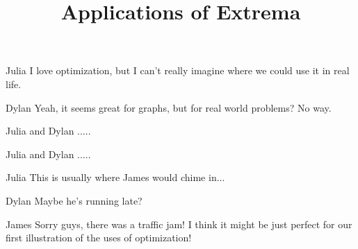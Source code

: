 \documentclass{ximera}
\title{Applications of Extrema}
\begin{document}
\maketitle
\begin{dialogue}
\item[Julia] I love optimization, but I can't really imagine where we could use it in real life.
\item[Dylan] Yeah, it seems great for graphs, but for real world problems? No way.
\item[Julia and Dylan] .....
\item[Julia and Dylan] .....
\item[Julia] This is usually where James would chime in...
\item[Dylan] Maybe he's running late?
\item[James] Sorry guys, there was a traffic jam! I think it might be just perfect for our first illustration of the uses of optimization!
\end{dialogue}
\end{document}
